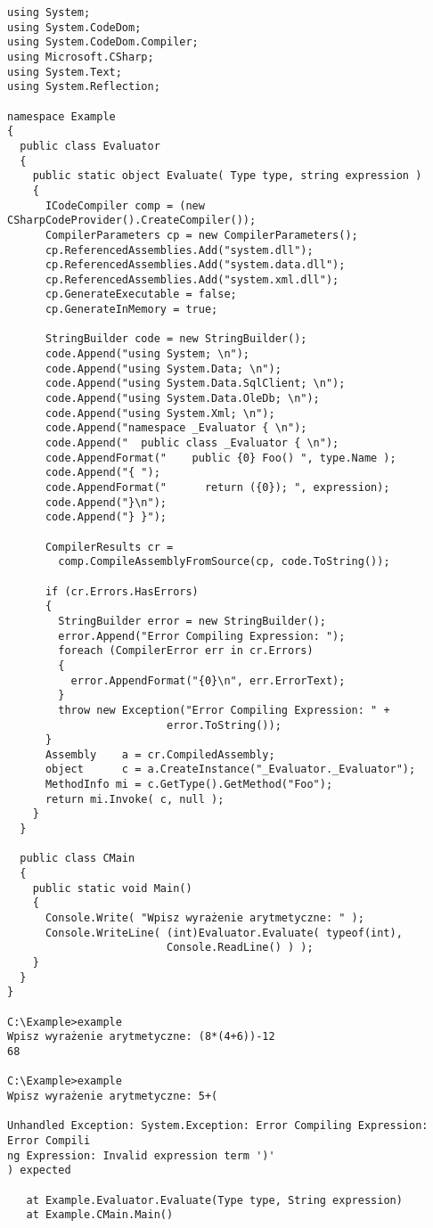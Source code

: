 \begin{scriptsize}
\begin{verbatim}
using System;
using System.CodeDom;
using System.CodeDom.Compiler;
using Microsoft.CSharp;
using System.Text;
using System.Reflection;

namespace Example
{
  public class Evaluator
  {
    public static object Evaluate( Type type, string expression )
    {
      ICodeCompiler comp = (new CSharpCodeProvider().CreateCompiler());
      CompilerParameters cp = new CompilerParameters();
      cp.ReferencedAssemblies.Add("system.dll");
      cp.ReferencedAssemblies.Add("system.data.dll");
      cp.ReferencedAssemblies.Add("system.xml.dll");
      cp.GenerateExecutable = false;
      cp.GenerateInMemory = true;

      StringBuilder code = new StringBuilder();
      code.Append("using System; \n");
      code.Append("using System.Data; \n");
      code.Append("using System.Data.SqlClient; \n");
      code.Append("using System.Data.OleDb; \n");
      code.Append("using System.Xml; \n");
      code.Append("namespace _Evaluator { \n");
      code.Append("  public class _Evaluator { \n");
      code.AppendFormat("    public {0} Foo() ", type.Name );
      code.Append("{ ");
      code.AppendFormat("      return ({0}); ", expression);
      code.Append("}\n");
      code.Append("} }");

      CompilerResults cr = 
        comp.CompileAssemblyFromSource(cp, code.ToString());

      if (cr.Errors.HasErrors)
      {
        StringBuilder error = new StringBuilder();
        error.Append("Error Compiling Expression: ");
        foreach (CompilerError err in cr.Errors)
        {
          error.AppendFormat("{0}\n", err.ErrorText);
        }
        throw new Exception("Error Compiling Expression: " + 
	                     error.ToString());
      }
      Assembly    a = cr.CompiledAssembly;
      object      c = a.CreateInstance("_Evaluator._Evaluator");
      MethodInfo mi = c.GetType().GetMethod("Foo");
      return mi.Invoke( c, null );
    }
  }

  public class CMain
  {
    public static void Main()
    {
      Console.Write( "Wpisz wyrażenie arytmetyczne: " );
      Console.WriteLine( (int)Evaluator.Evaluate( typeof(int), 
                         Console.ReadLine() ) );
    }
  }
}

C:\Example>example
Wpisz wyrażenie arytmetyczne: (8*(4+6))-12
68

C:\Example>example
Wpisz wyrażenie arytmetyczne: 5+(

Unhandled Exception: System.Exception: Error Compiling Expression: Error Compili
ng Expression: Invalid expression term ')'
) expected

   at Example.Evaluator.Evaluate(Type type, String expression)
   at Example.CMain.Main()
\end{verbatim}
\end{scriptsize}

